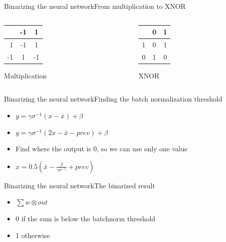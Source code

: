 \documentclass[10pt]{beamer}
\begin{document}
\begin{frame}{Binarizing the neural network}{From multiplication to XNOR}
	\begin{columns}[T] %
		\begin{column}{.48\textwidth}
		
			\begin{tabular}{r|c|c|}
				  & -1 & 1 \\ \hline
				1 & -1 & 1 \\ \hline
			   -1 &  1 & -1 \\
				\hline
			\end{tabular}

			Multiplication
		\end{column}%
		\hfill%
		\begin{column}{.48\textwidth}
			\begin{tabular}{r|c|c|}
				  & 0 & 1 \\ \hline
				1 & 0 & 1 \\ \hline
			    0 & 1 & 0 \\ \hline
			\end{tabular}

			XNOR
		\end{column}%
	\end{columns}
\end{frame}

\begin{frame}{Binarizing the neural network}{Finding the batch normalization threshold}
\begin{itemize}
	\item $y = \gamma \sigma^{-1}(x-\bar{x})+\beta$
	\item $y = \gamma \sigma^{-1}(2x-\bar{x}-prev)+\beta$
	\item Find where the output is 0, so we can use only one value
	\item $x = 0.5(\bar{x}-\frac{\beta}{\gamma \sigma^{-1}}+prev) $
\end{itemize}
\end{frame}

\begin{frame}{Binarizing the neural network}{The binarized result}
\begin{itemize}
	\item $\sum w \otimes out$
	\item 0 if the sum is below the batchnorm threshold
	\item 1 otherwise
\end{itemize}
\end{frame}
\end{document}
